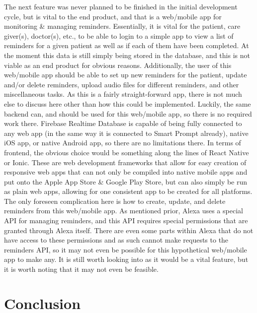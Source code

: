 \documentclass[11pt, oneside]{article}
\begin{document}
The next feature was never planned to be finished in the initial development cycle, but is vital to the end product, and that is a web/mobile app for monitoring \& managing reminders. 
Essentially, it is vital for the patient, care giver(s), doctor(s), etc., to be able to login to a simple app to view a list of reminders for a given patient as well as if each of them have been completed. 
At the moment this data is still simply being stored in the database, and this is not viable as an end product for obvious reasons. 
Additionally, the user of this web/mobile app should be able to set up new reminders for the patient, update and/or delete reminders, upload audio files for different reminders, and other miscellaneous tasks. 
As this is a fairly straight-forward app, there is not much else to discuss here other than how this could be implemented. 
Luckily, the same backend can, and should be used for this web/mobile app, so there is no required work there. 
Firebase Realtime Database is capable of being fully connected to any web app (in the same way it is connected to Smart Prompt already), native iOS app, or native Android app, so there are no limitations there. 
In terms of frontend, the obvious choice would be something along the lines of React Native or Ionic. 
These are web development frameworks that allow for easy creation of responsive web apps that can not only be compiled into native mobile apps and put onto the Apple App Store \& Google Play Store, but can also simply be run as plain web apps, allowing for one consistent app to be created for all platforms. 
The only foreseen complication here is how to create, update, and delete reminders from this web/mobile app. 
As mentioned prior, Alexa uses a special API for managing reminders, and this API requires special permissions that are granted through Alexa itself. 
There are even some parts within Alexa that do not have access to these permissions and as such cannot make requests to the reminders API, so it may not even be possible for this hypothetical web/mobile app to make any. 
It is still worth looking into as it would be a vital feature, but it is worth noting that it may not even be feasible. 


\section{Conclusion}
\end{document}
